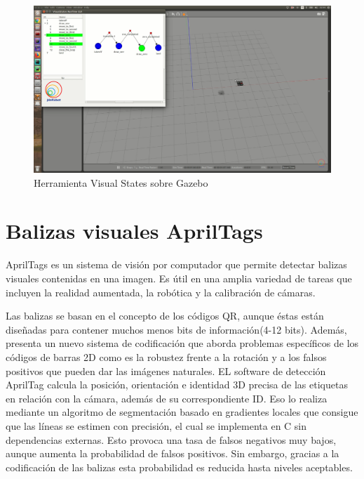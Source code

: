 \begin{figure}[H]
	\begin{center}
		\includegraphics[width=1\textwidth]{imag/IMG19.png}
				\caption{Herramienta Visual States sobre Gazebo} 
	\label{fig:Visual States.}	
	\end{center}
\end{figure}

\section{Balizas visuales AprilTags}
\hspace{1cm} AprilTags \cite{AprilTags2} es un sistema de visión por computador que permite detectar balizas visuales contenidas en una imagen. Es útil en una amplia variedad de tareas que incluyen la realidad aumentada, la robótica y la calibración de cámaras.

\hspace{1cm} Las balizas se basan en el concepto de los códigos QR, aunque éstas están diseñadas para contener muchos menos bits de información(4-12 bits). Además, presenta un nuevo sistema de codificación que aborda problemas específicos de los códigos de barras 2D como es la robustez frente a la rotación y a los falsos positivos que pueden dar las imágenes naturales. EL software de detección AprilTag calcula la posición, orientación e identidad 3D precisa de las etiquetas en relación con la cámara, además de su correspondiente ID. Eso lo realiza mediante un algoritmo de segmentación basado en gradientes locales que consigue que las líneas se estimen con precisión, el cual se implementa en C sin dependencias externas. Esto provoca una tasa de falsos negativos muy bajos, aunque aumenta la probabilidad de falsos positivos. Sin embargo, gracias a la codificación de las balizas esta probabilidad es reducida hasta niveles aceptables.
\\

